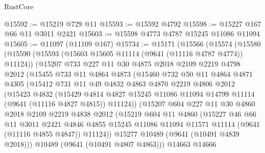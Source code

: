 \begin{lexlean}{RustCore}
\begin{coremodule}
@15592 := @15219 @729 @11
@15593 := @15592 @4792
@15598 := @15227 @167 @66 @11 @3011 @2421
@15603 := @15598 @4773 @4787 @15245 @11086 @11094
@15605 := @11097 (@11109 @167)
@15734 := @15171
    (@15566
      (@15574
        (@15580
          (@15590
            (@15593 (@15603 @15605 @11114 (@9641 (@11116 @4787 @4774)) @11124))
            (@15207
              @733
              @227
              @11
              @30
              @4875
              @2018
              @2109
              @2219
              @4798
              @2012
              (@15455
                @733
                @11
                @4864
                @4873
                (@15460
                  @732
                  @50
                  @11
                  @4864
                  @4871
                  @4305
                  (@15412
                    @731
                    @11
                    @49
                    @4832
                    @4863
                    @4870
                    @2219
                    @4806
                    @2012
                    (@15423
                      @4832
                      (@15429
                        @4814
                        @4827
                        @15245
                        @11086
                        @11094
                        @14799
                        @11114
                        (@9641 (@11116 @4827 @4815))
                        @11124))
                    (@15207
                      @604
                      @227
                      @11
                      @30
                      @4860
                      @2018
                      @2109
                      @2219
                      @4838
                      @2012
                      (@15219
                        @604
                        @11
                        @4860
                        (@15227
                          @46
                          @66
                          @11
                          @3011
                          @2421
                          @4846
                          @4855
                          @15245
                          @11086
                          @11094
                          @11571
                          @11114
                          (@9641 (@11116 @4855 @4847))
                          @11124))
                      @15277
                      @10489
                      (@9641 (@10491 @4839 @2018)))
                    @10489
                    (@9641 (@10491 @4807 @4863)))
                  @14663
                  @14666

\end{coremodule}
\end{lexlean}
